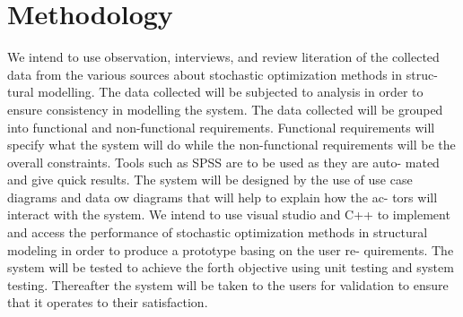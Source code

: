 \documentclass[12pt, letterpaper]{article}
\date{}
\begin{document}
 

\section{Methodology}
	
	We intend to use observation, interviews, and review literation of the collected
data from the various sources about stochastic optimization methods in struc-
tural modelling. The data collected will be subjected to analysis in order to
ensure consistency in modelling the system. The data collected will be grouped
into functional and non-functional requirements. Functional requirements will
specify what the system will do while the non-functional requirements will be
the overall constraints. Tools such as SPSS are to be used as they are auto-
mated and give quick results. The system will be designed by the use of use
case diagrams and data ow diagrams that will help to explain how the ac-
tors will interact with the system. We intend to use visual studio and C++
to implement and access the performance of stochastic optimization methods
in structural modeling in order to produce a prototype basing on the user re-
quirements. The system will be tested to achieve the forth objective using unit
testing and system testing. Thereafter the system will be taken to the users for
validation to ensure that it operates to their satisfaction.
\end{document}
